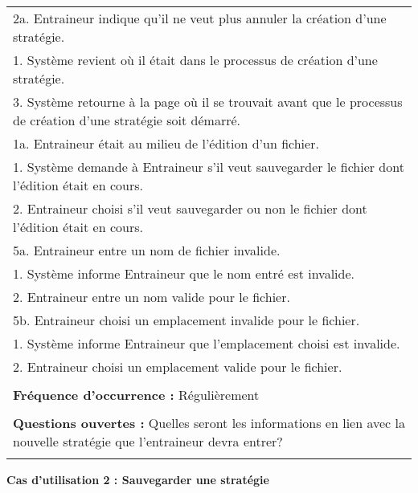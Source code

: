 \begin{tabular}{|p{16cm}|}
	\hspace{2cm}2a. Entraineur indique qu'il ne veut plus annuler la création d'une stratégie.\\
	\hspace{3cm}1. Système revient où il était dans le processus de création d'une stratégie.\\
	\hspace{1cm}3. Système retourne à la page où il se trouvait avant que le processus de création d'une stratégie soit démarré.\\
	1a. Entraineur était au milieu de l'édition d'un fichier.\\
	\hspace{1cm}1. Système demande à Entraineur s'il veut sauvegarder le fichier dont l'édition était en cours.\\
	\hspace{1cm}2. Entraineur choisi s'il veut sauvegarder ou non le fichier dont l'édition était en cours.\\
	5a. Entraineur entre un nom de fichier invalide.\\
	\hspace{1cm}1. Système informe Entraineur que le nom entré est invalide.\\
	\hspace{1cm}2. Entraineur entre un nom valide pour le fichier.\\
	5b. Entraineur choisi un emplacement invalide pour le fichier.\\
	\hspace{1cm}1. Système informe Entraineur que l'emplacement choisi est invalide.\\
	\hspace{1cm}2. Entraineur choisi un emplacement valide pour le fichier.\\
	\\
	\textbf{Fréquence d'occurrence :} Régulièrement\\
	\\
	\textbf{Questions ouvertes :} Quelles seront les informations en lien avec la nouvelle stratégie que l'entraineur devra entrer?\\
	\\
	\hline
\end{tabular}
\newpage
\begin{flushleft}
	\textbf{Cas d'utilisation 2 : Sauvegarder une stratégie}\\
\end{flushleft}
